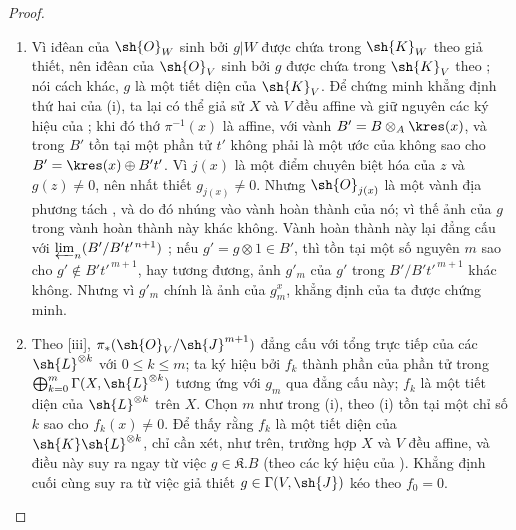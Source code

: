\documentclass[oneside,10pt]{amsart}
\renewcommand{\leq}{\leqslant}
\begin{document}
\begin{proof}
\begin{enumerate}
    \item[\rm{(i)}] Vì iđêan của $\sh{O}_W$ sinh bởi $g|W$ được chứa trong $\sh{K}_W$ theo giả thiết, nên iđêan của $\sh{O}_V$ sinh bởi $g$ được chứa trong $\sh{K}_V$ theo ; nói cách khác, $g$ là một tiết diện của $\sh{K}_V$.
        Để chứng minh khẳng định thứ hai của (i), ta lại có thể giả sử $X$ và $V$ đều affine và giữ nguyên các ký hiệu của ;
        khi đó thớ $\pi^{-1}(x)$ là affine, với vành $B'=B\otimes_A\kres(x)$, và trong $B'$ tồn tại một phần tử $t'$ không phải là một ước của không sao cho $B'=\kres(x)\oplus B't'$.
        Vì $j(x)$ là một điểm chuyên biệt hóa của $z$ và $g(z)\neq0$, nên nhất thiết $g_{j(x)}\neq0$.
        Nhưng $\sh{O}_{j(x)}$ là một vành địa phương tách , và do đó nhúng vào vành hoàn thành của nó; vì thế ảnh của $g$ trong vành hoàn thành này khác không.
        Vành hoàn thành này lại đẳng cấu với $\varprojlim_n(B'/B't'^{\,n+1})$ ;
        nếu $g'=g\otimes1\in B'$, thì tồn tại một số nguyên $m$ sao cho $g'\notin B't'^{\,m+1}$, hay tương đương, ảnh $g'_m$ của $g'$ trong $B'/B't'^{\,m+1}$ khác không.
        Nhưng vì $g'_m$ chính là ảnh của $g_m^x$, khẳng định của ta được chứng minh.
    \item[\rm{(ii)}] Theo [iii], $\pi_*(\sh{O}_V/\sh{J}^{m+1})$ đẳng cấu với tổng trực tiếp của các $\sh{L}^{\otimes k}$ với $0\leq k\leq m$;
        ta ký hiệu bởi $f_k$ thành phần của phần tử trong $\bigoplus_{k=0}^m\Gamma(X,\sh{L}^{\otimes k})$ tương ứng với $g_m$ qua đẳng cấu này; $f_k$ là một tiết diện của $\sh{L}^{\otimes k}$ trên $X$.
        Chọn $m$ như trong (i), theo (i) tồn tại một chỉ số $k$ sao cho $f_k(x)\neq0$.
        Để thấy rằng $f_k$ là một tiết diện của $\sh{K}\sh{L}^{\otimes k}$, chỉ cần xét, như trên, trường hợp $X$ và $V$ đều affine, và điều này suy ra ngay từ việc $g\in\mathfrak{K}.B$ (theo các ký hiệu của ).
        Khẳng định cuối cùng suy ra từ việc giả thiết $g\in\Gamma(V,\sh{J})$ kéo theo $f_0=0$.
\end{enumerate}
\end{proof}
\end{document}
